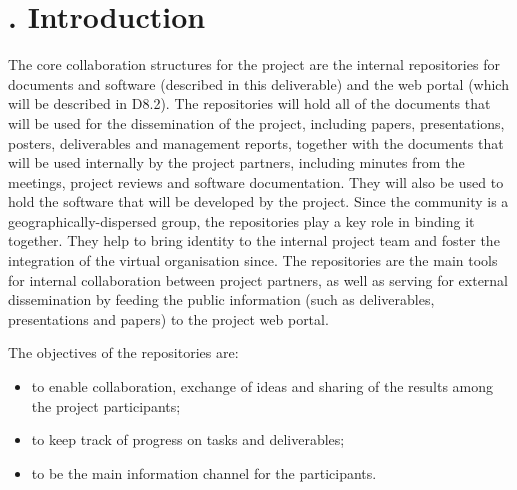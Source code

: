 \addtocounter{chapter}{1}
\setcounter{section}{0}
\setcounter{figure}{0}
\chapter*{\thechapter. Introduction}
\label{chap:introduction}



The core collaboration structures for the \Serums{} project are the
internal repositories for documents and software (described in this
deliverable) and the \Serums{} web portal (which will be described in
D8.2). The repositories will hold all of the documents that will
be used for the dissemination of the project, including papers,
presentations, posters, deliverables and management reports, together
with the documents that will be used internally by the project partners,
including minutes from the meetings, project reviews and software
documentation. They will also be used to hold the software that will
be developed by the project.
Since the \Serums{} community is a geographically-dispersed
group, the repositories play a key role in binding it
together. They help to bring identity to the internal project team and
foster the integration of the \Serums{} virtual organisation since. The
repositories are the main tools for internal collaboration between
project partners, as well as serving for external dissemination by
feeding the public information (such as deliverables, presentations and
papers) to the project web portal.


The objectives of the repositories are:
\begin{itemize}
\item to enable collaboration, exchange of ideas and sharing of the results among the project participants;
\item to keep track of progress on tasks and deliverables;
\item to be the main information channel for the participants.
\end{itemize}

